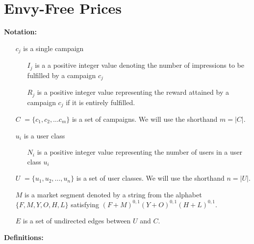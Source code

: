 \documentclass[12pt,letterpaper]{article}
\newcommand{\Campaign}{c}
\newcommand{\CampaignIndex}{j}
\newcommand{\Campaigns}{C}
\newcommand{\CardinalityCampaigns}{m}
\newcommand{\User}{u}
\newcommand{\UserIndex}{i}
\newcommand{\Users}{U}
\newcommand{\CardinalityUsers}{n}
\newcommand{\Market}{M}
\newcommand{\Impressions}{I}
\newcommand{\Reward}{R}
\newcommand{\NumberOfUsers}{N}
\newcommand{\Edges}{E}
\begin{document}
\section*{Envy-Free Prices}

\textbf{Notation:}

\begin{enumerate}
	\item[$\Campaign_\CampaignIndex$] is a single campaign
	\begin{enumerate}
		\item[$\Impressions_\CampaignIndex$] is a a positive integer value denoting the number of impressions to be fulfilled by a campaign $\Campaign_\CampaignIndex$
		\item[$\Reward_\CampaignIndex$] is a positive integer value representing the reward attained by a campaign $\Campaign_\CampaignIndex$ if it is entirely fulfilled. 
	\end{enumerate}
	\item[$\Campaigns$] $= \{\Campaign_1,\Campaign_2,\ldots \Campaign_\CardinalityCampaigns\}$ is a set of campaigns. We will use the shorthand $\CardinalityCampaigns = |\Campaigns|$.
	\item[$\User_\UserIndex$] is a user class
	\begin{enumerate}
		\item[$\NumberOfUsers_\UserIndex$] is a positive integer value representing the number of users in a user class $\User_\UserIndex$
	\end{enumerate}
	\item[$\Users$] $= \{\User_1,\User_2,\ldots, \User_\CardinalityUsers\}$ is a set of user classes. We will use the shorthand $\CardinalityUsers = |\Users|$.
	\item[$\Market$] is a market segment denoted by a string from the alphabet $\{F,M,Y,O,H,L\}$ satisfying $(F+M)^{0,1}(Y+O)^{0,1}(H+L)^{0,1}$.
	\item[$\Edges$] is a set of undirected edges between $\Users$ and $\Campaigns$.
\end{enumerate}


\textbf{Definitions:} 
\end{document}
